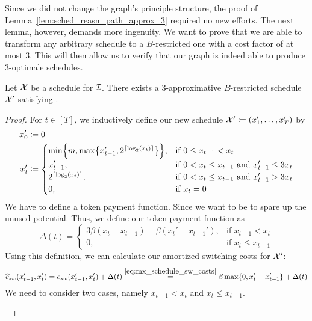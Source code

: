 Since we did not change the graph's principle structure, the proof of Lemma~\ref{lem:sched_reasn_path_approx_3} required no new efforts. The next lemma, however, demands more ingenuity. We want to prove that we are able to transform any arbitrary schedule to a $B$-restricted one with a cost factor of at most 3. This will then allow us to verify that our graph is indeed able to produce 3-optimale schedules.
\begin{lem}\label{lem:transform_schedule_approx_3}
Let $\mathcal{X}$ be a schedule for $\mathcal{I}$. There exists a 3-approximative $B$-restricted schedule $\mathcal{X}'$ satisfying .
\end{lem}
\begin{proof}
For $t\in[T]$, we inductively define our new schedule $\mathcal{X}'\coloneqq(x_1',\ldots,x_T')$ by
\begin{align}
		x'_0&\coloneqq 0\nonumber\\
		x'_t&\coloneqq 
		\begin{cases}
			\min\Bigl\{m,\max\bigl\{x_{t-1}',2^{\lceil \log_2(x_t)\rceil}\bigr\}\Bigr\}, & \text{if }0\le x_{t-1}<x_t\\
			x'_{t-1}, & \text{if $0<x_t\le x_{t-1}$ and }x'_{t-1}\le 3x_t\\
			2^{\lceil \log_2(x_t)\rceil}, & \text{if $0<x_t\le x_{t-1}$ and }x'_{t-1}>3x_t\\
			0, & \text{if }x_t=0
		\end{cases} \label{eq:xprime_approx_3}
\end{align}
We have to define a token payment function. Since we want to be to spare up the unused potential. Thus, we define our token payment function as
\begin{equation}
	\Delta(t)=\begin{cases}
		3\beta(x_t-x_{t-1})-\beta(x_t'-x_{t-1}'), & \text{if }x_{t-1}<x_t\\
		0, & \text{if }x_t\le x_{t-1}\label{eq:delta_approx_3}
	\end{cases}
\end{equation}
Using this definition, we can calculate our amortized switching costs for $\mathcal{X}'$: 
\begin{equation}
	\widehat{c}_{sw}(x_{t-1}',x_t')=c_{sw}(x_{t-1}',x_t')+\Delta(t)\stackrel{\eqref{eq:mx_schedule_sw_costs}}{=}\beta\max\{0,x_t'-x_{t-1}'\}+\Delta(t)\label{eq:aswcosts_approx_3}
\end{equation}
We need to consider two cases, namely $x_{t-1}<x_t$ and $x_t\le x_{t-1}$.
\begin{enumerate}[align=left]

\end{enumerate}
\end{proof}

